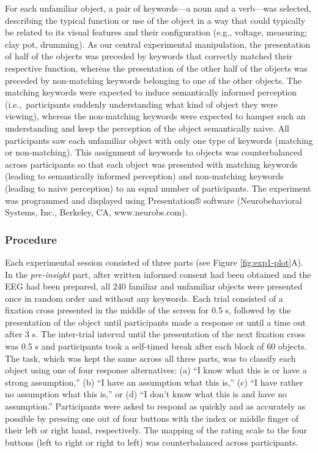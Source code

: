 \documentclass[
  english,
  doc,12pt,twoside,floatsintext]{apa7}
\begin{document}
For each unfamiliar object, a pair of keywords---a noun and a verb---was selected, describing the typical function or use of the object in a way that could typically be related to its visual features and their configuration (e.g., voltage, measuring; clay pot, drumming). As our central experimental manipulation, the presentation of half of the objects was preceded by keywords that correctly matched their respective function, whereas the presentation of the other half of the objects was preceded by non-matching keywords belonging to one of the other objects. The matching keywords were expected to induce semantically informed perception (i.e.,~participants suddenly understanding what kind of object they were viewing), whereas the non-matching keywords were expected to hamper such an understanding and keep the perception of the object semantically naive. All participants saw each unfamiliar object with only one type of keywords (matching or non-matching). This assignment of keywords to objects was counterbalanced across participants so that each object was presented with matching keywords (leading to semantically informed perception) and non-matching keywords (leading to naive perception) to an equal number of participants. The experiment was programmed and displayed using Presentation® software (Neurobehavioral Systems, Inc., Berkeley, CA, www.neurobs.com).

\hypertarget{procedure}{%
\subsubsection{Procedure}\label{procedure}}

Each experimental session consisted of three parts (see Figure \ref{fig:exp1-plot}A). In the \emph{pre-insight} part, after written informed consent had been obtained and the EEG had been prepared, all 240 familiar and unfamiliar objects were presented once in random order and without any keywords. Each trial consisted of a fixation cross presented in the middle of the screen for 0.5 s, followed by the presentation of the object until participants made a response or until a time out after 3 s. The inter-trial interval until the presentation of the next fixation cross was 0.5 s and participants took a self-timed break after each block of 60 objects. The task, which was kept the same across all three parts, was to classify each object using one of four response alternatives: (a) ``I know what this is or have a strong assumption,'' (b) ``I have an assumption what this is,'' (c) ``I have rather no assumption what this is,'' or (d) ``I don't know what this is and have no assumption.'' Participants were asked to respond as quickly and as accurately as possible by pressing one out of four buttons with the index or middle finger of their left or right hand, respectively. The mapping of the rating scale to the four buttons (left to right or right to left) was counterbalanced across participants.
\end{document}
